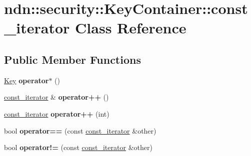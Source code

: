 \hypertarget{classndn_1_1security_1_1KeyContainer_1_1const__iterator}{}\section{ndn\+:\+:security\+:\+:Key\+Container\+:\+:const\+\_\+iterator Class Reference}
\label{classndn_1_1security_1_1KeyContainer_1_1const__iterator}
\subsection*{Public Member Functions}
\begin{DoxyCompactItemize}
\item 
\hyperlink{classndn_1_1security_1_1Key}{Key} {\bfseries operator$\ast$} ()\hypertarget{classndn_1_1security_1_1KeyContainer_1_1const__iterator_a22c0e04eeca4400c6a3a5fdd2d295681}{}\label{classndn_1_1security_1_1KeyContainer_1_1const__iterator_a22c0e04eeca4400c6a3a5fdd2d295681}

\item 
\hyperlink{classndn_1_1security_1_1KeyContainer_1_1const__iterator}{const\+\_\+iterator} \& {\bfseries operator++} ()\hypertarget{classndn_1_1security_1_1KeyContainer_1_1const__iterator_a097e389baeb098ea7379c29d9ed969fc}{}\label{classndn_1_1security_1_1KeyContainer_1_1const__iterator_a097e389baeb098ea7379c29d9ed969fc}

\item 
\hyperlink{classndn_1_1security_1_1KeyContainer_1_1const__iterator}{const\+\_\+iterator} {\bfseries operator++} (int)\hypertarget{classndn_1_1security_1_1KeyContainer_1_1const__iterator_aa3d400b47f2ac9069b5b00a11b554fa1}{}\label{classndn_1_1security_1_1KeyContainer_1_1const__iterator_aa3d400b47f2ac9069b5b00a11b554fa1}

\item 
bool {\bfseries operator==} (const \hyperlink{classndn_1_1security_1_1KeyContainer_1_1const__iterator}{const\+\_\+iterator} \&other)\hypertarget{classndn_1_1security_1_1KeyContainer_1_1const__iterator_af00d1d30f7d3f126dd43e91b4980887c}{}\label{classndn_1_1security_1_1KeyContainer_1_1const__iterator_af00d1d30f7d3f126dd43e91b4980887c}

\item 
bool {\bfseries operator!=} (const \hyperlink{classndn_1_1security_1_1KeyContainer_1_1const__iterator}{const\+\_\+iterator} \&other)\hypertarget{classndn_1_1security_1_1KeyContainer_1_1const__iterator_a33e1dfdefdd1eaf85c2afcab978baed8}{}\label{classndn_1_1security_1_1KeyContainer_1_1const__iterator_a33e1dfdefdd1eaf85c2afcab978baed8}

\end{DoxyCompactItemize}
